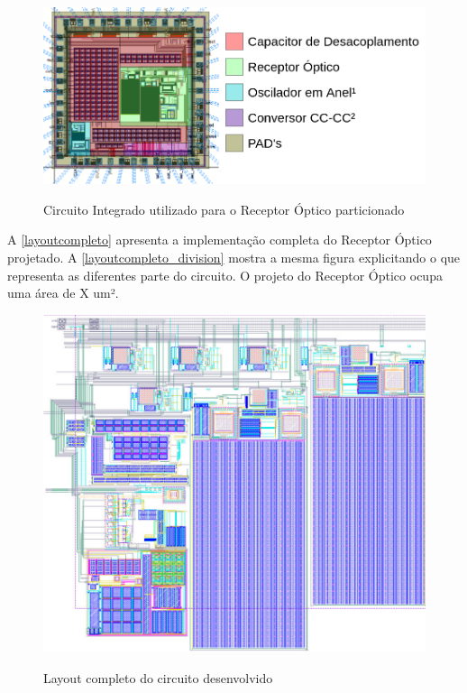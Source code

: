 \begin{figure}[htb]
 \centering
    \caption{Circuito Integrado utilizado para o Receptor Óptico particionado} 
    \includegraphics[scale=0.5]{Resultados/Imagens/Image_CircuitoIntegrado.png}
    \label{fig_circintegrado_division}
\end{figure}

A \autoref{layoutcompleto} apresenta a implementação completa do Receptor Óptico projetado. A \autoref{layoutcompleto_division} mostra a mesma figura explicitando o que representa as diferentes parte do circuito. O projeto do Receptor Óptico ocupa uma área de X um².

\begin{figure}[htb]
 \centering
    \caption{Layout completo do circuito desenvolvido} 
    \includegraphics[scale=1, angle = 90]{Resultados/Imagens/Circuito Completo.png}
    \label{layoutcompleto}
\end{figure}

